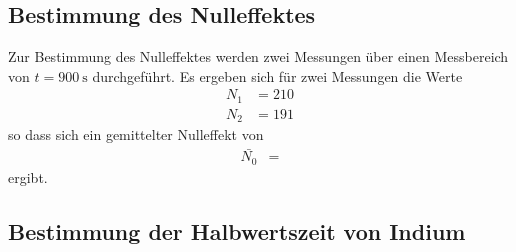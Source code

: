 
\subsection{Bestimmung des Nulleffektes}
Zur Bestimmung des Nulleffektes werden zwei Messungen über einen Messbereich von $t = \SI{900}{\second}$ durchgeführt.
Es ergeben sich für zwei Messungen die Werte
\begin{align*}
  N_1 &= \num{210} \\
  N_2 &= \num{191}
\end{align*}
so dass sich ein gemittelter Nulleffekt von
\begin{align}
  \bar{N_0}&= 
  \label{eqn:nulleffekt}
\end{align}
ergibt.

\subsection{Bestimmung der Halbwertszeit von Indium}

